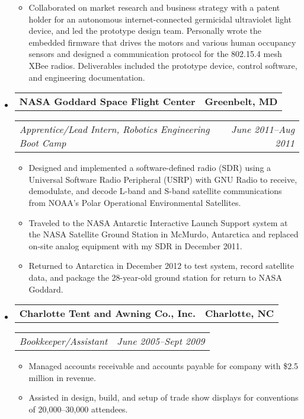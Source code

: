 \documentclass[10pt,letterpaper]{article}
\newcommand{\headerrow}[2]{%
    \begin{tabularx}{\linewidth}{Xr}
	    #1 & #2 \\
    \end{tabularx}
}
\begin{document}
\begin{itemize}
\begin{itemize}
        \item Collaborated on market research and business strategy with a
            patent holder for an autonomous internet-connected germicidal
            ultraviolet light device, and led the prototype design team.
            Personally wrote the embedded firmware that drives the motors and
            various human occupancy sensors and designed a communication
            protocol for the 802.15.4 mesh XBee radios.  Deliverables included
            the prototype device, control software, and engineering
            documentation.
	\end{itemize}

	\item
	\headerrow{\textbf{NASA Goddard Space Flight Center}}{\textbf{Greenbelt, MD}}
	\headerrow{\textit{Apprentice/Lead Intern, Robotics Engineering Boot Camp}}
		{\textit{June 2011--Aug 2011}}
	\begin{itemize}
        \item Designed and implemented a software-defined radio (SDR) using a
            Universal Software Radio Peripheral (USRP) with GNU Radio to
            receive, demodulate, and decode L-band and S-band satellite
            communications from NOAA's Polar Operational Environmental
            Satellites.

        \item Traveled to the NASA Antarctic Interactive Launch Support
            system at the NASA Satellite Ground Station in McMurdo, Antarctica
            and replaced on-site analog equipment with my SDR in December 2011.

        \item Returned to Antarctica in December 2012 to test system, record
            satellite data, and package the 28-year-old ground station for
            return to NASA Goddard.
	\end{itemize}

	\item
	\headerrow{\textbf{Charlotte Tent and Awning Co., Inc.}}{\textbf{Charlotte, NC}}
	\headerrow{\textit{Bookkeeper/Assistant}}{\textit{June 2005--Sept 2009}}
	\begin{itemize}
        \item Managed accounts receivable and accounts payable for company with
            \$2.5 million in revenue.

        \item Assisted in design, build, and setup of trade show displays for
            conventions of 20,000--30,000 attendees.
	\end{itemize}

\end{itemize}
\end{document}
